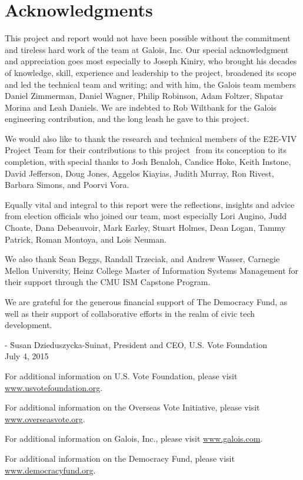 \chapter*{Acknowledgments}
\label{chapter:acknowledgments}

This project and report would not have been possible without the
commitment and tireless hard work of the team at Galois, Inc. Our
special acknowledgment and appreciation goes most especially to
Joseph Kiniry, who brought his decades of knowledge, skill, experience
and leadership to the project, broadened its scope and led the
technical team and writing; and with him, the Galois team members
Daniel Zimmerman, Daniel Wagner, Philip Robinson, Adam Foltzer,
Shpatar Morina and Leah Daniels. We are indebted to Rob Wiltbank for
the Galois engineering contribution, and the long leash he gave to
this project. 

We would also like to thank the research and technical members of the
E2E-VIV Project Team for their contributions to this project  from its
conception to its completion, with special thanks to Josh Benaloh,
Candice Hoke, Keith Instone, David Jefferson, Doug Jones, Aggelos
Kiayias, Judith Murray, Ron Rivest, Barbara Simons, and Poorvi Vora. 

Equally vital and integral to this report were the reflections,
insights and advice from election officials who joined our team, most
especially Lori Augino, Judd Choate, Dana Debeauvoir, Mark Earley,
Stuart Holmes, Dean Logan, Tammy Patrick, Roman Montoya, and Lois
Neuman.

We also thank Sean Beggs, Randall Trzeciak, and Andrew Wasser,
Carnegie Mellon University, Heinz College Master of Information
Systems Management for their support through the CMU ISM Capstone
Program. 

We are grateful for the generous financial support of The Democracy
Fund, as well as their support of collaborative efforts in the realm
of civic tech development. 

\begin{tabbing}
- \= Susan Dzieduszycka-Suinat, President and CEO, U.S. Vote
Foundation \\
\> July 4, 2015
\end{tabbing}

\vspace{\fill}

For additional information on U.S. Vote Foundation, please visit
\url{www.usvotefoundation.org}.   

For additional information on the Overseas Vote Initiative, please
visit \url{www.overseasvote.org}. 

For additional information on Galois, Inc., please visit
\url{www.galois.com}.

For additional information on the Democracy Fund, please visit
\url{www.democracyfund.org}.

